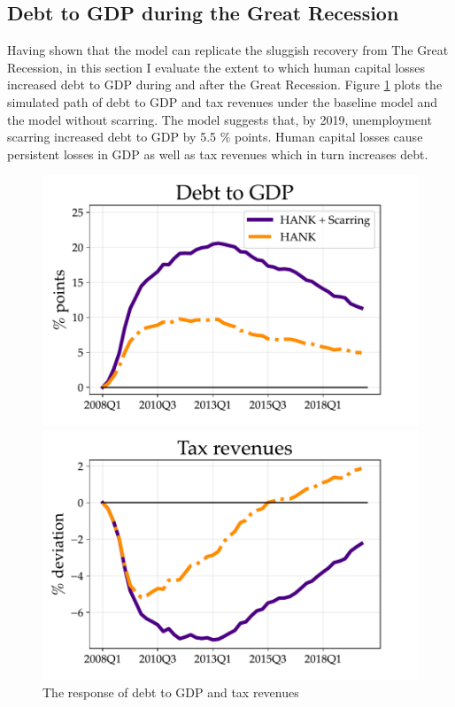 \subsection{Debt to GDP during the Great Recession}


Having shown that the model can replicate the sluggish recovery from The Great Recession, in this section I evaluate the extent to which human capital losses increased debt to GDP during and after the Great Recession. Figure \ref{DebtGDP_sim} plots the simulated path of debt to GDP and tax revenues under the baseline model and the model without scarring. The model suggests that, by 2019, unemployment scarring increased debt to GDP by 5.5 $\%$ points. Human capital losses cause persistent losses in GDP as well as tax revenues which in turn increases debt.

\begin{figure}[!ht]
    \centering
   \begin{minipage}{0.48\textwidth}
        \centering
        \includegraphics[scale=.57]{text/chapter1/Figures/GR_sim/debt2GDP_GR} %
    \end{minipage}\hfill
    \begin{minipage}{0.48\textwidth}
        \centering
        \includegraphics[scale=.57]{text/chapter1/Figures/GR_sim/tax_rev} %
    \end{minipage}
    \caption{The response of debt to GDP and tax revenues}
    \label{DebtGDP_sim}
\end{figure}




